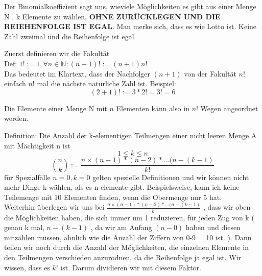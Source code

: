 \documentclass[headsepline,12pt,a4paper]{scrartcl}
\begin{document}
\item Der Binomialkoeffizient sagt uns, wieviele Möglichkeiten es gibt aus einer Menge N , k Elemente zu wählen, \textbf{OHNE ZURÜCKLEGEN UND DIE REIEHENFOLGE IST EGAL}. Man merke sich, dass es wie Lotto ist. Keine Zahl zweimal und die Reihenfolge ist egal.
\item Zuerst definieren wir die Fakultät \\
Def: $1!:=1, \forall n\in \mathbb{N} : (n+1)! := (n+1)n! $ \\
Das bedeutet im Klartext, dass der Nachfolger $(n+1)$ von der Fakultät $n!$ einfach $n!$ mal die nächste natürliche Zahl ist. Beispiel:
$$ (2+1)! := 3 * 2! = 3! = 6 $$
\item Die Elemente einer Menge N mit $n$ Elementen kann also in $n!$ Wegen angeordnet werden.
\item Definition: Die Anzahl der k-elementigen Teilmengen einer nicht leeren Menge A mit Mächtigkeit n ist 
$$ 1 \leq k \leq n $$
$$ \binom{n}{k}:= \frac{n\times (n-1)* (n-2)*...(n-(k-1)}{k!} $$ 
für Spezialfälle $n=0, k=0 $ gelten spezielle Definitionen und wir können nicht mehr Dinge k wählen, als es n elemente gibt. Beispielsweise, kann ich keine Teilemenge mit 10 Elementen finden, wenn die Obermenge nur 5 hat.  \\
Weiterhin überlegen wir uns bei $\frac{n\times (n-1)* (n-2)*...(n-(k-1)}{k!}$ , dass wir oben die Möglichkeiten haben, die sich immer um 1 reduzieren, für jeden Zug von k ( genau k mal, $ n-(k-1) $ , da wir am Anfang $(n-0)$ haben und diesen mitzählen müssen, ähnlich wie die Anzahl der Ziffern von 0-9 = 10 ist. ). Dann teilen wir noch durch die Anzahl der Möglichkeiten, die einzelnen Elemente in den Teilmengen verschieden anzurodnen, da die Reihenfolge ja egal ist. Wir wissen, dass es $k!$ ist. Darum dividieren wir mit diesem Faktor. \\
\end{document}
